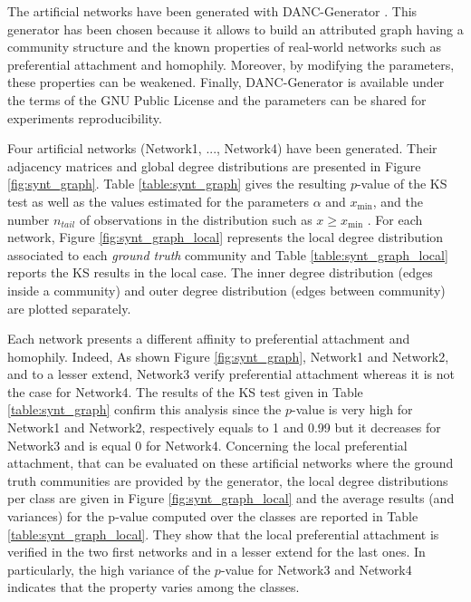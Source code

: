 \documentclass[a4paper, 12pt]{article}
\begin{document}
The artificial networks have been generated with DANC-Generator \cite{largeron2015}. This generator has been chosen because it allows to build an attributed graph having a community structure  and  the known properties of real-world networks such as preferential attachment and homophily.
Moreover, by modifying the parameters, these properties can be weakened. Finally, DANC-Generator is available under the terms of the GNU Public License and the parameters can be shared for experiments reproducibility.

Four artificial networks (Network1, ..., Network4) have been generated. Their adjacency matrices and global degree distributions are presented in Figure \ref{fig:synt_graph}. Table \ref{table:synt_graph} gives the resulting $p$-value of the KS test as well as the  values estimated for the parameters  $\alpha$ and $x_\text{min}$,  and  the number $n_{tail}$ of observations in the distribution such as $x \geq x_\text{min}$ . For each network, Figure \ref{fig:synt_graph_local} represents the local degree distribution associated to each \emph{ground truth} community and Table \ref{table:synt_graph_local} reports the KS results in the local case. The inner degree distribution (edges inside a community) and outer degree distribution (edges between community) are plotted separately.

Each network presents a different affinity to preferential attachment and homophily.
Indeed, As shown Figure \ref{fig:synt_graph}, Network1 and Network2, and to a lesser extend, Network3 verify preferential attachment whereas it is not the case for Network4. The results of the KS test given in Table \ref{table:synt_graph} confirm this analysis since the $p$-value is very high for Network1 and Network2, respectively equals to 1 and 0.99 but it decreases for Network3 and is equal 0 for Network4.
Concerning the local preferential attachment, that can be evaluated on these artificial networks where the ground truth communities are provided by the generator, the local degree distributions per class are given in Figure \ref{fig:synt_graph_local} and the average results (and variances) for the p-value computed over the classes are reported in Table \ref{table:synt_graph_local}. They show that the local preferential attachment is verified in the two first networks and in a lesser extend for the  last ones. In particularly, the high variance of the $p$-value for Network3 and Network4 indicates that the property varies among the classes.



\end{document}
